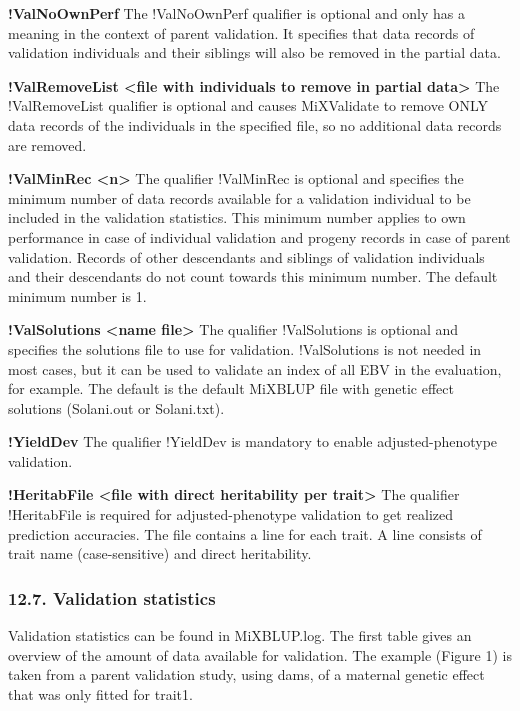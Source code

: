 \textbf{!ValNoOwnPerf} The !ValNoOwnPerf qualifier is optional and only
has a meaning in the context of parent validation. It specifies that
data records of validation individuals and their siblings will also be
removed in the partial data.

\textbf{!ValRemoveList \textless file with individuals to remove in
partial data\textgreater{}} The !ValRemoveList qualifier is optional and
causes MiXValidate to remove ONLY data records of the individuals in the
specified file, so no additional data records are removed.

\textbf{!ValMinRec \textless n\textgreater{}} The qualifier !ValMinRec
is optional and specifies the minimum number of data records available
for a validation individual to be included in the validation statistics.
This minimum number applies to own performance in case of individual
validation and progeny records in case of parent validation. Records of
other descendants and siblings of validation individuals and their
descendants do not count towards this minimum number. The default
minimum number is 1.

\textbf{!ValSolutions \textless name file\textgreater{}} The qualifier
!ValSolutions is optional and specifies the solutions file to use for
validation. !ValSolutions is not needed in most cases, but it can be
used to validate an index of all EBV in the evaluation, for example. The
default is the default MiXBLUP file with genetic effect solutions
(Solani.out or Solani.txt).

\textbf{!YieldDev} The qualifier !YieldDev is mandatory to enable
adjusted-phenotype validation.

\textbf{!HeritabFile \textless file with direct heritability per
trait\textgreater{}} The qualifier !HeritabFile is required for
adjusted-phenotype validation to get realized prediction accuracies. The
file contains a line for each trait. A line consists of trait name
(case-sensitive) and direct heritability.

\subsubsection{12.7. Validation statistics}\label{Vali09}

Validation statistics can be found in MiXBLUP.log. The first table gives
an overview of the amount of data available for validation. The example
(Figure 1) is taken from a parent validation study, using dams, of a
maternal genetic effect that was only fitted for trait1.

